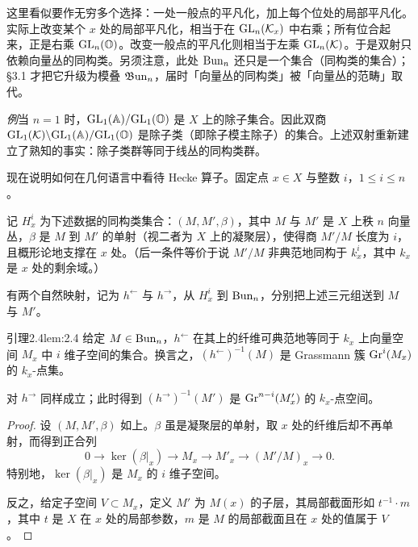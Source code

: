 \begin{annote}
这里看似要作无穷多个选择：一处一般点的平凡化，加上每个位处的局部平凡化。实际上改变某个 $x$ 处的局部平凡化，相当于在 $\mathrm{GL}_n(\mathcal{K}_x)$ 中右乘；所有位合起来，正是右乘 $\mathrm{GL}_n(\mathbb{O})$。改变一般点的平凡化则相当于左乘 $\mathrm{GL}_n(\mathcal{K})$。于是双射只依赖向量丛的同构类。另须注意，此处 $\operatorname{Bun}_n$ 还只是一个集合（同构类的集合）；\S3.1 才把它升级为模叠 $\mathfrak{B}\mathrm{un}_n$，届时「向量丛的同构类」被「向量丛的范畴」取代。\par\vspace{0.15em}{\raggedleft 【来源：原书 \S2.1、\S3.1（A）】\par}
\end{annote}

\emph{例}\quad 当 $n=1$ 时，$\mathrm{GL}_1(\mathbb{A})/\mathrm{GL}_1(\mathbb{O})$ 是 $X$ 上的除子集合。因此双商 $\mathrm{GL}_1(\mathcal{K})\backslash\allowbreak\mathrm{GL}_1(\mathbb{A})/\mathrm{GL}_1(\mathbb{O})$ 是除子类（即除子模主除子）的集合。上述双射重新建立了熟知的事实：除子类群等同于线丛的同构类群。

现在说明如何在几何语言中看待 Hecke 算子。固定点 $x\in X$ 与整数 $i$，$1\le i\le n$。

记 $H_x^i$ 为下述数据的同构类集合：$(M,M',\beta)$，其中 $M$ 与 $M'$ 是 $X$ 上秩 $n$ 向量丛，$\beta$ 是 $M$ 到 $M'$ 的单射（视二者为 $X$ 上的凝聚层），使得商 $M'/M$ 长度为 $i$，且概形论地支撑在 $x$ 处。（后一条件等价于说 $M'/M$ 非典范地同构于 $k_x^i$，其中 $k_x$ 是 $x$ 处的剩余域。）

有两个自然映射，记为 $h^{\leftarrow}$ 与 $h^{\rightarrow}$，从 $H_x^i$ 到 $\operatorname{Bun}_n$，分别把上述三元组送到 $M$ 与 $M'$。

\begin{othm}{引理}{2.4}{lem:2.4}
给定 $M\in\operatorname{Bun}_n$，$h^{\leftarrow}$ 在其上的纤维可典范地等同于 $k_x$ 上向量空间 $M_x$ 中 $i$ 维子空间的集合。换言之，$(h^{\leftarrow})^{-1}(M)$ 是 Grassmann 簇 $\mathrm{Gr}^i(M_x)$ 的 $k_x$-点集。
\end{othm}

对 $h^{\rightarrow}$ 同样成立；此时得到 $(h^{\rightarrow})^{-1}(M')$ 是 $\mathrm{Gr}^{n-i}(M'_x)$ 的 $k_x$-点空间。

\begin{proof}
设 $(M,M',\beta)$ 如上。$\beta$ 虽是凝聚层的单射，取 $x$ 处的纤维后却不再单射，而得到正合列
\[
0\to\ker(\beta|_x)\to M_x\to M'_x\to(M'/M)_x\to0.
\]
特别地，$\ker(\beta|_x)$ 是 $M_x$ 的 $i$ 维子空间。

反之，给定子空间 $V\subset M_x$，定义 $M'$ 为 $M(x)$ 的子层，其局部截面形如 $t^{-1}\cdot m$，其中 $t$ 是 $X$ 在 $x$ 处的局部参数，$m$ 是 $M$ 的局部截面且在 $x$ 处的值属于 $V$。
\end{proof}

